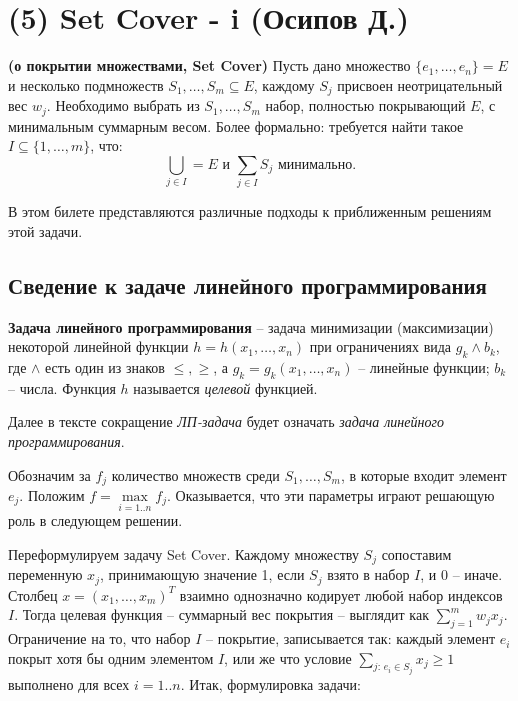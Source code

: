 \hypertarget{setcover}{\section{(5) Set Cover - i (Осипов Д.)}}

\begin{problem*}{\bfseries(о покрытии множествами, Set Cover)}
	Пусть дано множество $\{e_1, \ldots, e_n\} = E$ и несколько подмножеств $S_1, \ldots, S_m \subseteq E$, каждому $S_j$ присвоен неотрицательный вес $w_j$. Необходимо выбрать из $S_1, \ldots, S_m$ набор, полностью покрывающий $E$, с минимальным суммарным весом. Более формально: требуется найти такое $I \subseteq \{1, \ldots, m\}$, что: $$\bigcup_{j\in I} = E \text{ и } \sum_{j \in I} S_j \text{ минимально.}$$
\end{problem*}

В этом билете представляются различные подходы к приближенным решениям этой задачи.

\subsection{Сведение к задаче линейного программирования}

\begin{definition*}
	{\bfseries Задача линейного программирования} -- задача минимизации (максимизации) некоторой линейной функции $h = h(x_1, \ldots, x_n)$ при ограничениях вида $g_k \land b_k$, где $\land$ есть один из знаков $\leq, \geq$, а $g_k = g_k(x_1, \ldots, x_n)$ -- линейные функции; $b_k$ -- числа. Функция $h$ называется \textit{целевой} функцией.
\end{definition*}

Далее в тексте сокращение \textit{ЛП-задача} будет означать \textit{задача линейного программирования}.

Обозначим за $f_j$ количество множеств среди $S_1, \ldots, S_m$, в которые входит элемент $e_j$. Положим $f = \max\limits_{i=1..n} f_j$. Оказывается, что эти параметры играют решающую роль в следующем решении.

Переформулируем задачу Set Cover. Каждому множеству $S_j$ сопоставим переменную $x_j$, принимающую значение 1, если $S_j$ взято в набор $I$, и 0 -- иначе. Столбец $x = (x_1, \ldots, x_m)^T$ взаимно однозначно кодирует любой набор индексов $I$. Тогда целевая функция -- суммарный вес покрытия -- выглядит как $\sum\limits_{j=1}^m w_j x_j$. Ограничение на то, что набор $I$ -- покрытие, записывается так: каждый элемент $e_i$ покрыт хотя бы одним элементом $I$, или же что условие $\sum\limits_{j:\, e_i \in S_j} x_j \geq 1$ выполнено для всех $i=1..n$. Итак, формулировка задачи:

